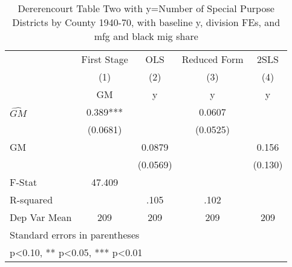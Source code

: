 \begin{table}[htbp]\centering
\def\sym#1{\ifmmode^{#1}\else\(^{#1}\)\fi}
\caption{Dererencourt Table Two with y=Number of Special Purpose Districts by County 1940-70, with baseline y, division FEs, and mfg and black mig share}
\begin{tabular}{l*{4}{c}}
\toprule
                    & First Stage   &         OLS   &Reduced Form   &        2SLS   \\
                    &\multicolumn{1}{c}{(1)}&\multicolumn{1}{c}{(2)}&\multicolumn{1}{c}{(3)}&\multicolumn{1}{c}{(4)}\\
                    &\multicolumn{1}{c}{GM}&\multicolumn{1}{c}{y}&\multicolumn{1}{c}{y}&\multicolumn{1}{c}{y}\\
\midrule
$\hat{GM}$          &       0.389***&               &      0.0607   &               \\
                    &    (0.0681)   &               &    (0.0525)   &               \\
\addlinespace
GM                  &               &      0.0879   &               &       0.156   \\
                    &               &    (0.0569)   &               &     (0.130)   \\
\midrule
F-Stat              &      47.409   &               &               &               \\
R-squared           &               &        .105   &        .102   &               \\
Dep Var Mean        &         209   &         209   &         209   &         209   \\
\bottomrule
\multicolumn{5}{l}{\footnotesize Standard errors in parentheses}\\
\multicolumn{5}{l}{\footnotesize * p<0.10, ** p<0.05, *** p<0.01}\\
\end{tabular}
\end{table}
